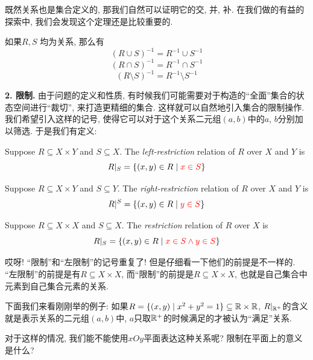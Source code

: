 既然关系也是集合定义的, 那我们自然可以证明它的交, 并, 补. 在我们做的有益的探索中, 我们会发现这个定理还是比较重要的. 

\begin{theorem}[关系的逆]
    如果$R, S$ 均为关系, 那么有
  \[
    (R \cup S)^{-1} = R^{-1} \cup S^{-1}
  \]
  \[
    (R \cap S)^{-1} = R^{-1} \cap S^{-1}
  \]
  \[
    (R \setminus S)^{-1} = R^{-1} \setminus S^{-1}
  \]
\end{theorem}

\textbf{2. 限制. } 由于问题的定义和性质, 有时候我们可能需要对于构造的``全面''集合的状态空间进行``裁切'', 来打造更精细的集合. 这样就可以自然地引入集合的限制操作. 我们希望引入这样的记号, 使得它可以对于这个关系二元组$(a,b)$中的$a$, $b$分别加以筛选. 于是我们有定义: 

\begin{definition}
  Suppose $R \subseteq X \times Y$ and $S \subseteq X$.
  The {\it left-restriction} relation of $R$  over $X$ and $Y$ is
  \[
    R|_{S} = \{(x, y) \in R \mid \textcolor{red}{x \in S}\}
  \]
\end{definition}

\begin{definition}
  Suppose $R \subseteq X \times Y$ and $S \subseteq Y$.
  The {\it right-restriction} relation of $R$  over $X$ and $Y$ is
  \[
    R|^{S} = \{(x, y) \in R \mid \textcolor{red}{y \in S}\}
  \]
\end{definition}

\begin{definition}[限制 (Restriction)]
  Suppose $R \subseteq X \times X$ and $S \subseteq X$.
  The {\it restriction} relation of $R$  over $X$ is
  \[
    R|_{S} = \{(x, y) \in R \mid \textcolor{red}{x \in S \land y \in S}\}
  \]
\end{definition}

哎呀! ``限制''和``左限制''的记号重复了! 但是仔细看一下他们的前提是不一样的. ``左限制''的前提是有$R \subseteq X \times X$, 而``限制''的前提是$R \subseteq X \times X$, 也就是自己集合中元素到自己集合元素的关系. 

下面我们来看刚刚举的例子: 如果$R = \{(x, y) \mid x^2 + y^2 = 1\} \subseteq \mathbb{R} \times \mathbb{R}$, $R|_{\mathbb{R}^{+}}$的含义就是表示关系的二元组$(a,b)中$, $a$只取$\mathbb{R}^+$的时候满足的才被认为``满足''关系. 

\begin{bonus}
对于这样的情况, 我们能不能使用$xOy$平面表达这种关系呢? 限制在平面上的意义是什么? 
\end{bonus}

